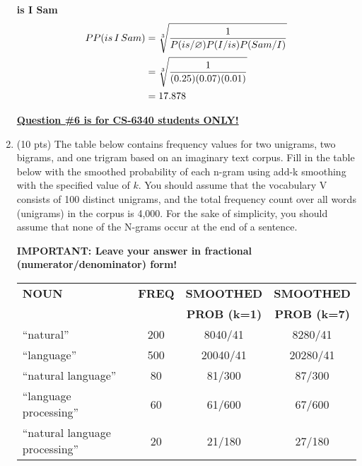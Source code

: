 \documentclass[11pt]{article}
\begin{document}
\begin{enumerate}
\bf is I Sam \\
\begin{equation*}
   \begin{split}
   PP(is \thinspace I \thinspace Sam) & = \sqrt[3]{\frac{1}{P(is/\varnothing) P(I/is) P(Sam/I)}} \\ 
                 &  = \sqrt[3]{\frac{1}{(0.25) (0.07) (0.01)}}  \\
                 &= 17.878 \\
\end{split}
\end{equation*}
  
\underline{\textbf{Question \#6 is for CS-6340 students ONLY!}}  \\

\item (10 pts) The table below contains frequency values for two 
  unigrams, two bigrams, and one trigram based on an imaginary text corpus. Fill
  in the table below with the smoothed  probability of each n-gram using
  add-k smoothing with the specified value of $k$.  You should assume that the
  vocabulary V consists  of 100 distinct unigrams, and the total
  frequency count over all words (unigrams) in the corpus is 4,000.
  For the sake of simplicity, you should assume that none of the
  N-grams occur at the end of a sentence. 

  {\bf IMPORTANT: Leave your answer in fractional
    (numerator/denominator) form! } \\

  \begin{center}
 \begin{tabular}{|l|c|c|c|} \hline
 {\bf NOUN} & {\bf FREQ} & {\bf SMOOTHED} & {\bf SMOOTHED} \\
 ~ & ~ & {\bf PROB (k=1)} & {\bf PROB (k=7)} \\ \hline
``natural'' & 200 & 8040/41 & 8280/41\\ \hline
``language'' & 500 & 20040/41 & 20280/41\\ \hline
``natural language'' &  80 & 81/300 & 87/300\\ \hline
``language processing''    &  60 & 61/600 & 67/600\\ \hline
``natural language processing'' &  20 & 21/180 & 27/180 \\ \hline
 \end{tabular}
 \end{center}



\end{enumerate}
\end{document}
